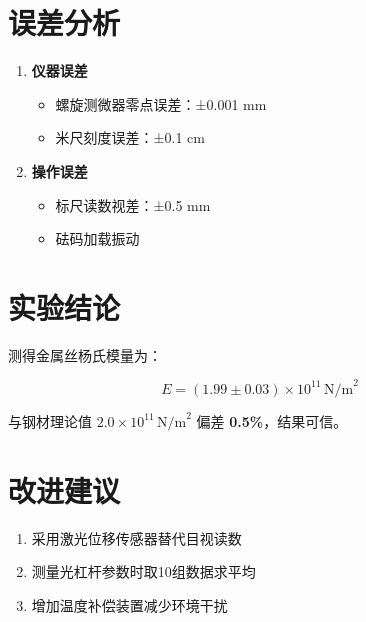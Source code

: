 \documentclass[12pt,a4paper]{article}
\begin{document}
\section{误差分析}

\begin{enumerate}
\item \textbf{仪器误差}
\begin{itemize}
\item 螺旋测微器零点误差：±0.001 mm
\item 米尺刻度误差：±0.1 cm
\end{itemize}

\item \textbf{操作误差}
\begin{itemize}
\item 标尺读数视差：±0.5 mm
\item 砝码加载振动
\end{itemize}
\end{enumerate}

\section{实验结论}

测得金属丝杨氏模量为：

\begin{equation}
E = (1.99 \pm 0.03) \times 10^{11} \, \text{N/m}^2
\end{equation}

与钢材理论值 $2.0 \times 10^{11} \, \text{N/m}^2$ 偏差 \textbf{0.5\%}，结果可信。

\section{改进建议}

\begin{enumerate}
\item 采用激光位移传感器替代目视读数
\item 测量光杠杆参数时取10组数据求平均
\item 增加温度补偿装置减少环境干扰
\end{enumerate}
\end{document}
